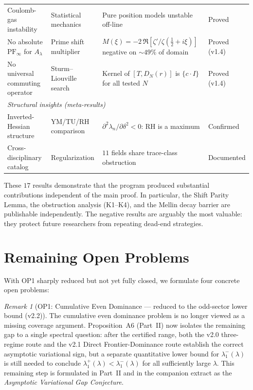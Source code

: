 \documentclass[12pt,a4paper]{article}
\theoremstyle{definition}
\theoremstyle{remark}
\newtheorem{remark}[theorem]{Remark}
\begin{document}
\begin{center}
{\begin{tabular}{p{4.2cm}|p{3.2cm}|p{4.2cm}|l}
Coulomb-gas instability & Statistical mechanics & Pure position models unstable off-line & Proved \\
No absolute $\mathrm{PF}_\infty$ for $A_\lambda$ & Prime shift multiplier & $M(\xi) = -2\,\Re[\zeta'/\zeta(\tfrac{1}{2}+i\xi)]$ negative on $\sim\!49\%$ of domain & Proved (v1.4) \\
No universal commuting operator & Sturm--Liouville search & Kernel of $[T, D_N(r)]$ is $\{c \cdot I\}$ for all tested $N$ & Proved (v1.4) \\[4pt]
\multicolumn{4}{l}{\emph{Structural insights (meta-results)}} \\[2pt]
Inverted-Hessian structure & YM/TU/RH comparison & $\partial^2\lambda_n/\partial\delta^2 < 0$: RH is a maximum & Confirmed \\
Cross-disciplinary catalog & Regularization & $11$ fields share trace-class obstruction & Documented
\end{tabular}}
\end{center}

\noindent These $17$ results demonstrate that the program produced substantial contributions independent of the main proof. In particular, the Shift Parity Lemma, the obstruction analysis (K1--K4), and the Mellin decay barrier are publishable independently. The negative results are arguably the most valuable: they protect future researchers from repeating dead-end strategies.


\section{Remaining Open Problems}
\label{sec:open-problems}

With OP1 sharply reduced but not yet fully closed, we formulate four concrete
open problems:

\begin{remark}[OP1: Cumulative Even Dominance --- reduced to the odd-sector lower bound (v2.2)]
\label{rem:OP1-resolved}
The cumulative even dominance problem is no longer viewed as a missing
coverage argument. Proposition~A6 (Part~II) now isolates the remaining gap to
a single spectral question: after the certified range, both the v2.0
three-regime route and the v2.1 Direct Frontier-Dominance route establish the
correct asymptotic variational sign, but a separate quantitative lower bound
for $\lambda_1^-(\lambda)$ is still needed to conclude
$\lambda_1^+(\lambda)<\lambda_1^-(\lambda)$ for all sufficiently large
$\lambda$. This remaining step is formulated in Part~II and in the companion
extract \cite{Geiger2026evendom} as the \emph{Asymptotic Variational Gap
Conjecture}.
\end{remark}
\end{document}

